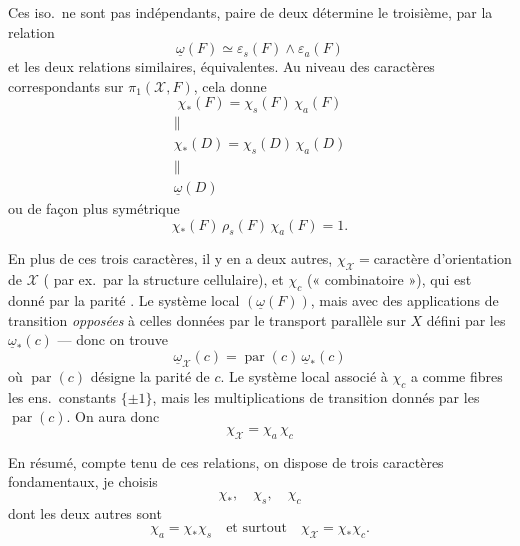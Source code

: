 \documentclass[11pt,a4paper]{article}
\begin{document}
Ces iso.\ ne sont pas indépendants,  paire de deux détermine le troisième, par la relation
\[
\underline{\omega}(F) \simeq \varepsilon_s(F) \wedge \varepsilon_a(F)
\]
et les deux relations similaires, équivalentes. Au niveau des caractères correspondants sur $\pi_1(\mathcal{X}, F)$, cela donne
\[
\boxed{\chi_{\ast}(F) = \chi_s(F)\,\chi_a(F)}
\]
\[
\begin{array}{c}
\| \\
\chi_{\ast}(D) = \chi_s(D)\,\chi_a(D) \\
\| \\
\underline{\omega}(D)
\end{array}
\]
ou de façon plus symétrique
\[
\chi_{\ast}(F)\,\rho_s(F)\,\chi_a(F) = 1.
\]

En plus de ces trois caractères, il y en a deux autres, $\chi_{\mathcal{X}} = {}$caractère d'orientation de $\mathcal{X}$ ( par ex.\ par la structure cellulaire), et $\chi_c$ (« combinatoire »), qui est donné par la parité . Le système local   $(\underline{\omega}(F))$, mais avec des applications de transition \emph{opposées} à celles données par \struck{\ill{}} le transport parallèle sur $X$ défini par les $\underline{\omega}_{\ast}(c)$ --- donc on trouve
\[
\underline{\omega}_{\mathcal{X}}(c) = \operatorname{par}(c)\,\underline{\omega}_{\ast}(c)
\]
où $\operatorname{par}(c)$ désigne la parité de $c$.  Le système local associé à $\chi_c$  a comme fibres les ens.\ constants $\lbrace \pm 1 \rbrace$, mais les multiplications de transition donnés par les $\operatorname{par}(c)$. On aura donc
\[
\boxed{\chi_{\mathcal{X}} = \chi_a\,\chi_c}
\]

En résumé, compte tenu de ces relations, on dispose de trois caractères fondamentaux,  je choisis
\[
\chi_{\ast}, \quad \chi_s, \quad \chi_c
\]
dont les deux autres sont
\[
\chi_a = \chi_{\ast} \chi_s \quad \text{et surtout} \quad \chi_{\mathcal{X}} = \chi_{\ast} \chi_c.
\]
\end{document}
